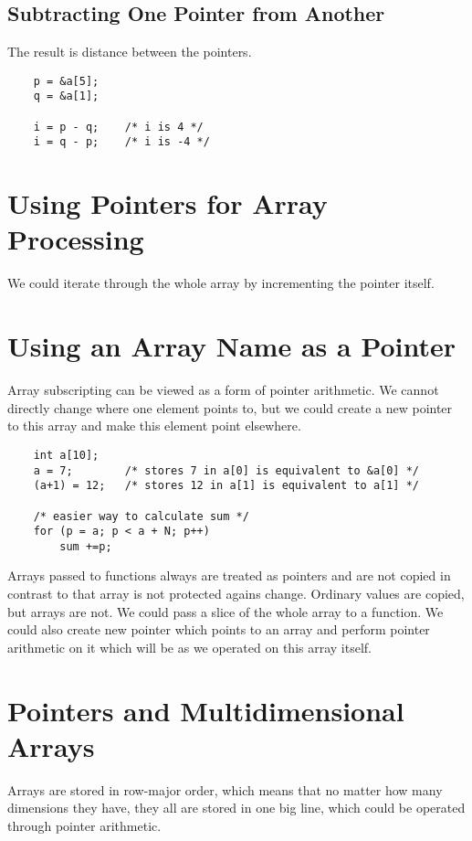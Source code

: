 \documentclass[openany]{book}
\begin{document}
    \subsection*{Subtracting One Pointer from Another}
    The result is distance between the pointers.
    \begin{lstlisting}
    p = &a[5];
    q = &a[1];

    i = p - q;    /* i is 4 */
    i = q - p;    /* i is -4 */
    \end{lstlisting}

    \section{Using Pointers for Array Processing}
    We could iterate through the whole array by incrementing the pointer itself.

    \section{Using an Array Name as a Pointer}
    Array subscripting can be viewed as a form of pointer arithmetic. We cannot directly change where one element
    points to, but we could create a new pointer to this array and make this element point elsewhere.
    \begin{lstlisting}
    int a[10];
    a = 7;        /* stores 7 in a[0] is equivalent to &a[0] */
    (a+1) = 12;   /* stores 12 in a[1] is equivalent to a[1] */

    /* easier way to calculate sum */
    for (p = a; p < a + N; p++)
        sum +=p;
    \end{lstlisting}
    Arrays passed to functions always are treated as pointers and are not copied in contrast to that array is
    not protected agains change. Ordinary values are copied, but arrays are not. We could pass a slice of the
    whole array to a function. We could also create new pointer which points to an array and perform pointer
    arithmetic on it which will be as we operated on this array itself.

    \section{Pointers and Multidimensional Arrays}
    Arrays are stored in row-major order, which means that no matter how many dimensions they have, they all are
    stored in one big line, which could be operated through pointer arithmetic. 
\end{document}

